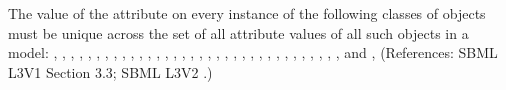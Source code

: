 The value of the attribute  on every instance of the following
classes of objects must be unique across the set of all 
attribute values of 
{all such objects in a model:
{
\AlgebraicRule,
\AssignmentRule,
\Compartment,
\Constraint,
\Delay,
\Event,
\EventAssignment,
\FunctionDefinition,
\InitialAssignment,
\KineticLaw,
\ListOfCompartments,
\ListOfConstraints,
\ListOfEventAssignments,
\ListOfEvents,
\ListOfFunctionDefinitions,
\ListOfInitialAssignments,
\ListOfLocalParameters,
\ListOfModifierSpeciesReferences,
\ListOfParameters,
\ListOfReactions,
\ListOfRules,
\ListOfSpecies,
\ListOfSpeciesReferences,
\ListOfUnitDefinitions,
\ListOfUnits,
\Model,
\ModifierSpeciesReference,
\Parameter,
\Priority,
\RateRule,
\Reaction,
\Species,
\SpeciesReference,
\Trigger, and
\Unit
}}, 
(References: SBML L3V1 Section 3.3; SBML L3V2 .)
